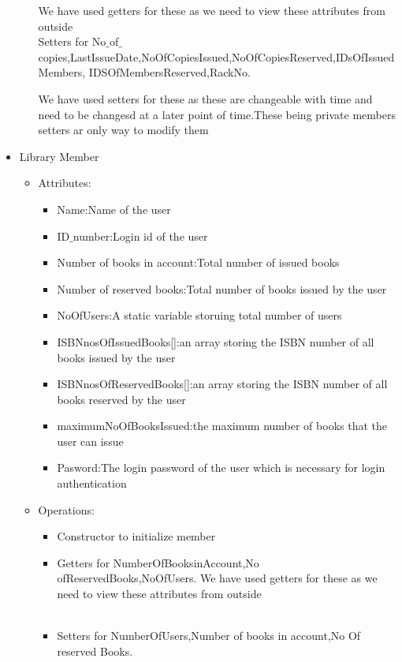 \documentclass{article}
\begin{document}
\begin{itemize}
\begin{itemize}
We have used getters for these as we need to view these attributes from outside 
\\
Setters for No$\_$of$\_$copies,LastIssueDate,NoOfCopiesIssued,NoOfCopiesReserved,IDsOfIssuedMembers, IDSOfMembersReserved,RackNo.

We have used setters for these as these are changeable with time and need to be changesd at a later point of time.These being private members setters ar only way to modify them
\end{itemize}


\item Library Member 
\begin{itemize}
\item Attributes:
\begin{itemize}
\item Name:Name of the user
\item ID$\_$number:Login id of the user
\item Number of books in account:Total number of issued books
\item Number of reserved books:Total number of books issued by the user
\item NoOfUsers:A static variable storuing total number of users
\item ISBNnosOfIssuedBooks[]:an array storing the ISBN number of all books issued by the user
\item ISBNnosOfReservedBooks[]:an array storing the ISBN number of all books reserved by the user
\item maximumNoOfBooksIssued:the maximum number of books that the user can issue
\item Pasword:The login password of the user which is necessary for login authentication
\end{itemize}

\item Operations:
\begin{itemize}

\item Constructor to initialize member\\
\item Getters for NumberOfBooksinAccount,No ofReservedBooks,NoOfUsers.
We have used getters for these as we need to view these attributes from outside \\\
\item Setters for NumberOfUsers,Number of books in account,No Of reserved Books.



\end{itemize}
\end{itemize}
\end{itemize}
\end{document}
